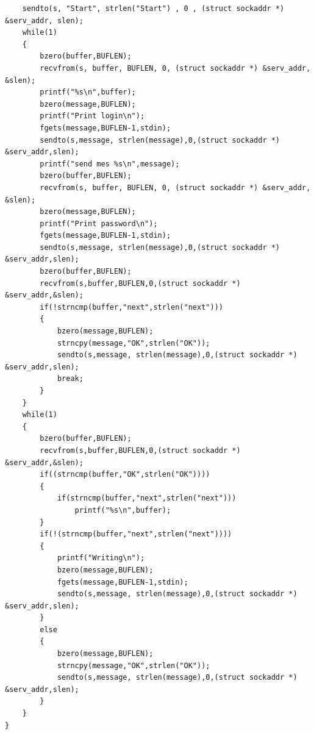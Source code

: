 \documentclass[10pt,a4paper]{report}
\begin{document}
\begin{verbatim}
	sendto(s, "Start", strlen("Start") , 0 , (struct sockaddr *) &serv_addr, slen);
	while(1)
	{
		bzero(buffer,BUFLEN);
		recvfrom(s, buffer, BUFLEN, 0, (struct sockaddr *) &serv_addr, &slen);
		printf("%s\n",buffer);
		bzero(message,BUFLEN);
		printf("Print login\n");
		fgets(message,BUFLEN-1,stdin);
		sendto(s,message, strlen(message),0,(struct sockaddr *) &serv_addr,slen);
		printf("send mes %s\n",message);
		bzero(buffer,BUFLEN);
		recvfrom(s, buffer, BUFLEN, 0, (struct sockaddr *) &serv_addr, &slen);
		bzero(message,BUFLEN);
		printf("Print password\n");
		fgets(message,BUFLEN-1,stdin);
		sendto(s,message, strlen(message),0,(struct sockaddr *) &serv_addr,slen);
		bzero(buffer,BUFLEN);
		recvfrom(s,buffer,BUFLEN,0,(struct sockaddr *) &serv_addr,&slen);
		if(!strncmp(buffer,"next",strlen("next")))
		{
    		bzero(message,BUFLEN);
    		strncpy(message,"OK",strlen("OK"));
			sendto(s,message, strlen(message),0,(struct sockaddr *) &serv_addr,slen);
    		break;
		}
	}
    while(1)
    {
    	bzero(buffer,BUFLEN);
		recvfrom(s,buffer,BUFLEN,0,(struct sockaddr *) &serv_addr,&slen);
    	if((strncmp(buffer,"OK",strlen("OK"))))
    	{
    		if(strncmp(buffer,"next",strlen("next")))
    			printf("%s\n",buffer);
    	}
    	if(!(strncmp(buffer,"next",strlen("next"))))
    	{
    		printf("Writing\n");
    		bzero(message,BUFLEN);
    		fgets(message,BUFLEN-1,stdin);
			sendto(s,message, strlen(message),0,(struct sockaddr *) &serv_addr,slen);
    	}
    	else
    	{
    		bzero(message,BUFLEN);
    		strncpy(message,"OK",strlen("OK"));
			sendto(s,message, strlen(message),0,(struct sockaddr *) &serv_addr,slen);
    	}
    }
}
\end{verbatim}
\end{document}
